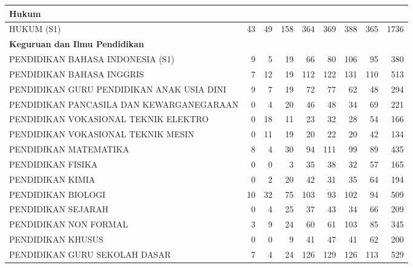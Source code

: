 \documentclass[
]{book}
\begin{document}
\begin{table}[H]
{\begin{tabular}{l|r|r|r|r|r|r|r|r}
\hline
\multicolumn{9}{l}{\textbf{Hukum}}\\
\hline
\hspace{1em}HUKUM (S1) & 43 & 49 & 158 & 364 & 369 & 388 & 365 & 1736\\
\hline
\multicolumn{9}{l}{\textbf{Keguruan dan Ilmu Pendidikan}}\\
\hline
\hspace{1em}PENDIDIKAN BAHASA INDONESIA (S1) & 9 & 5 & 19 & 66 & 80 & 106 & 95 & 380\\
\hline
\hspace{1em}PENDIDIKAN BAHASA INGGRIS & 7 & 12 & 19 & 112 & 122 & 131 & 110 & 513\\
\hline
\hspace{1em}PENDIDIKAN GURU PENDIDIKAN ANAK USIA DINI & 9 & 7 & 19 & 72 & 77 & 62 & 48 & 294\\
\hline
\hspace{1em}PENDIDIKAN PANCASILA DAN KEWARGANEGARAAN & 0 & 4 & 20 & 46 & 48 & 34 & 69 & 221\\
\hline
\hspace{1em}PENDIDIKAN VOKASIONAL TEKNIK ELEKTRO & 0 & 18 & 11 & 23 & 32 & 28 & 54 & 166\\
\hline
\hspace{1em}PENDIDIKAN VOKASIONAL TEKNIK MESIN & 0 & 11 & 19 & 20 & 22 & 20 & 42 & 134\\
\hline
\hspace{1em}PENDIDIKAN MATEMATIKA & 8 & 4 & 30 & 94 & 111 & 99 & 89 & 435\\
\hline
\hspace{1em}PENDIDIKAN FISIKA & 0 & 0 & 3 & 35 & 38 & 32 & 57 & 165\\
\hline
\hspace{1em}PENDIDIKAN KIMIA & 0 & 2 & 20 & 42 & 31 & 35 & 64 & 194\\
\hline
\hspace{1em}PENDIDIKAN BIOLOGI & 10 & 32 & 75 & 103 & 93 & 102 & 94 & 509\\
\hline
\hspace{1em}PENDIDIKAN SEJARAH & 0 & 4 & 25 & 37 & 43 & 34 & 66 & 209\\
\hline
\hspace{1em}PENDIDIKAN NON FORMAL & 3 & 9 & 24 & 60 & 61 & 103 & 85 & 345\\
\hline
\hspace{1em}PENDIDIKAN KHUSUS & 0 & 0 & 9 & 41 & 47 & 41 & 62 & 200\\
\hline
\hspace{1em}PENDIDIKAN GURU SEKOLAH DASAR & 7 & 4 & 24 & 126 & 129 & 126 & 113 & 529\\

\end{tabular}}
\end{table}
\end{document}
